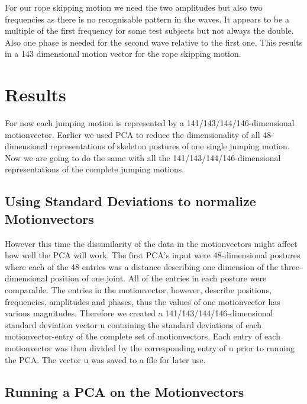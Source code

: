 \documentclass[a4paper]{article}
\begin{document}
For our rope skipping motion we need the two amplitudes but also two frequencies as there is no recognisable pattern in the waves.
It appears to be a multiple of the first frequency for some test subjects but not always the double.
Also one phase is needed for the second wave relative to the first one.
This results in a 143 dimensional motion vector for the rope skipping motion.


\section{Results}

For now each jumping motion is represented by a 141/143/144/146-dimensional motionvector.
Earlier we used PCA to reduce the dimensionality of all 48-dimensional representations of skeleton postures of one single jumping motion.
Now we are going to do the same with all the 141/143/144/146-dimensional representations of the complete jumping motions.

\subsection{Using Standard Deviations to normalize Motionvectors}

However this time the dissimilarity of the data in the motionvectors might affect how well the PCA will work.
The first PCA's input were 48-dimensional postures where each of the 48 entries was a distance describing one dimension of the three-dimensional position of one joint.
All of the entries in each posture were comparable.
The entries in the motionvector, however, describe positions, frequencies, amplitudes and phases, thus the values of one motionvector has various magnitudes.
Therefore we created a 141/143/144/146-dimensional standard deviation vector u containing the standard deviations of each motionvector-entry of the complete set of motionvectors.
Each entry of each motionvector was then divided by the corresponding entry of u prior to running the PCA.
The vector u was saved to a file for later use.

\subsection{Running a PCA on the Motionvectors}
\end{document}
